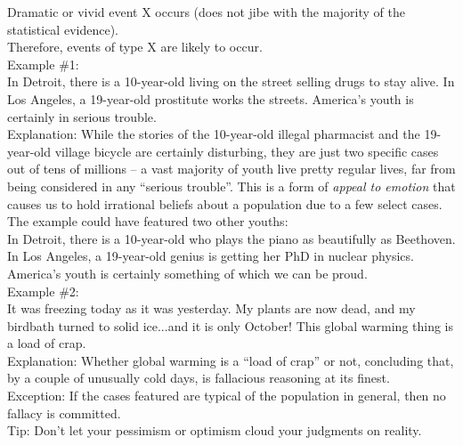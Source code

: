 \documentclass[a4paper,12pt,single,pdftex]{scrartcl}
\begin{document}
    
      Dramatic or vivid event X occurs (does not jibe with the majority of the statistical evidence).
    \\

    
      Therefore, events of type X are likely to occur.
    \\

    
      Example \#1:
    \\

    
      In Detroit, there is a 10-year-old living on the street selling drugs to stay alive.  In Los Angeles, a 19-year-old prostitute works the streets.  America’s youth is certainly in serious trouble.
    \\

    
      Explanation: While the stories of the 10-year-old illegal pharmacist and the 19-year-old village bicycle are certainly disturbing, they are just two specific cases out of tens of millions -- a vast majority of youth live pretty regular lives, far from being considered in any “serious trouble”.  This is a form of {\it appeal to emotion} that causes us to hold irrational beliefs about a population due to a few select cases.  The example could have featured two other youths:
    \\

    
      In Detroit, there is a 10-year-old who plays the piano as beautifully as Beethoven.  In Los Angeles, a 19-year-old genius is getting her PhD in nuclear physics.  America’s youth is certainly something of which we can be proud.
    \\

    
      Example \#2:
    \\

    
      It was freezing today as it was yesterday.  My plants are now dead, and my birdbath turned to solid ice...and it is only October!  This global warming thing is a load of crap.
    \\

    
      Explanation: Whether global warming is a “load of crap” or not, concluding that, by a couple of unusually cold days, is fallacious reasoning at its finest.
    \\

    
      Exception: If the cases featured are typical of the population in general, then no fallacy is committed.
    \\

    
      Tip: Don’t let your pessimism or optimism cloud your judgments on reality.
    \\
\end{document}
